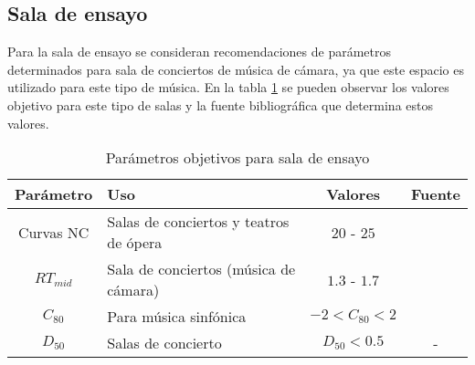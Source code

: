 \subsection{Sala de ensayo}
Para la sala de ensayo se consideran recomendaciones de parámetros determinados para sala de conciertos de música de cámara, ya que este espacio es utilizado para este tipo de música. En la tabla \ref{tab: parametros objetivos sala de ensayo} se pueden observar los valores objetivo para este tipo de salas y la fuente bibliográfica que determina estos valores.
\begin{table}[H]
    \centering
    \begin{tabular}{|c|l|c|c|}
    \hline
    \textbf{Parámetro} & \textbf{Uso}                           & \textbf{Valores} & \textbf{Fuente}  \\ \hline
    Curvas NC          & Salas de conciertos y teatros de ópera & $20$ - $25$      & \cite{Recuero} \\ \hline
    $RT_{mid}$         & Sala de conciertos (música de cámara)  & $1.3$ - $1.7$    & \cite{carrion1990diseno} \\ \hline
    $C_{80}$           & Para música sinfónica                  & $-2<C_{80}<2$    &  \cite{marshall1994}  \\ \hline   
    $D_{50}$           & Salas de concierto                     & $D_{50}<0.5$     &  - \\ \hline
    \end{tabular}
    \caption{Parámetros objetivos para sala de ensayo}
    \label{tab: parametros objetivos sala de ensayo}
\end{table}